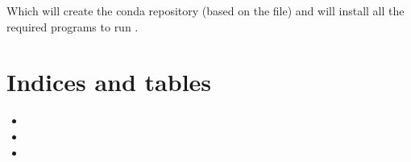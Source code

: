 \documentclass[letterpaper,10pt,english]{sphinxmanual}
\begin{document}
\begin{sphinxVerbatim}[commandchars=\\\{\}]
\end{sphinxVerbatim}

Which will create the  conda repository (based on the
 file) and will install all the required programs to run
.


\chapter{Indices and tables}
\label{\detokenize{index:indices-and-tables}}\begin{itemize}
\item {} 

\item {} 

\item {} 

\end{itemize}



\renewcommand{\indexname}{Index}
\printindex
\end{document}
